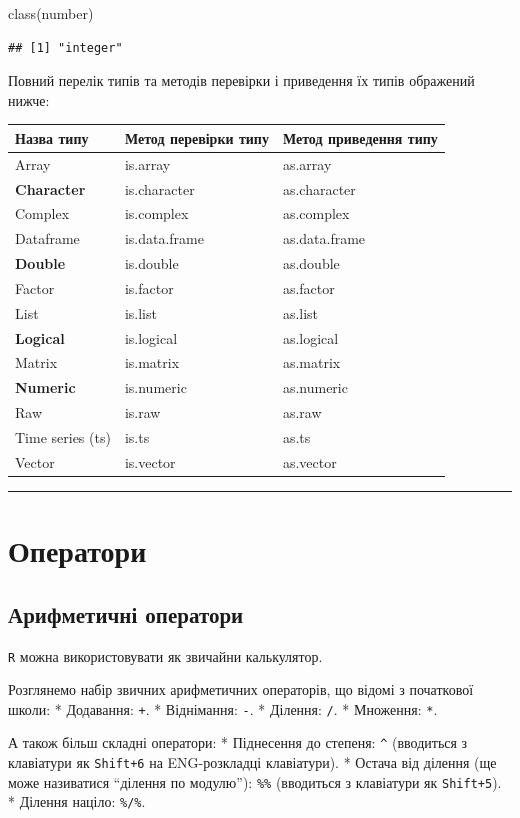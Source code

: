 \documentclass[
]{book}
\newenvironment{Shaded}{\begin{snugshade}}{\end{snugshade}}
\newcommand{\FunctionTok}[1]{\textcolor[rgb]{0.00,0.00,0.00}{#1}}
\newcommand{\NormalTok}[1]{#1}
\begin{document}
\begin{Shaded}
\begin{Highlighting}[]
\FunctionTok{class}\NormalTok{(number)}
\end{Highlighting}
\end{Shaded}

\begin{verbatim}
## [1] "integer"
\end{verbatim}

Повний перелік типів та методів перевірки і приведення їх типів ображений нижче:

\begin{longtable}[]{@{}lll@{}}
\toprule
Назва типу & Метод перевірки типу & Метод приведення типу\tabularnewline
\midrule
\endhead
Array & is.array & as.array\tabularnewline
\textbf{Character} & is.character & as.character\tabularnewline
Complex & is.complex & as.complex\tabularnewline
Dataframe & is.data.frame & as.data.frame\tabularnewline
\textbf{Double} & is.double & as.double\tabularnewline
Factor & is.factor & as.factor\tabularnewline
List & is.list & as.list\tabularnewline
\textbf{Logical} & is.logical & as.logical\tabularnewline
Matrix & is.matrix & as.matrix\tabularnewline
\textbf{Numeric} & is.numeric & as.numeric\tabularnewline
Raw & is.raw & as.raw\tabularnewline
Time series (ts) & is.ts & as.ts\tabularnewline
Vector & is.vector & as.vector\tabularnewline
\bottomrule
\end{longtable}

\begin{center}\rule{0.5\linewidth}{0.5pt}\end{center}

\hypertarget{chapter23}{%
\section{Оператори}\label{chapter23}}

\hypertarget{chapter231}{%
\subsection{Арифметичні оператори}\label{chapter231}}

\texttt{R} можна використовувати як звичайни калькулятор.

Розглянемо набір звичних арифметичних операторів, що відомі з початкової школи:
* Додавання: \texttt{+}.
* Віднімання: \texttt{-}.
* Ділення: \texttt{/}.
* Множення: \texttt{*}.

А також більш складні оператори:
* Піднесення до степеня: \texttt{\^{}} (вводиться з клавіатури як \texttt{Shift+6} на ENG-розкладці клавіатури).
* Остача від ділення (ще може називатися ``ділення по модулю''): \texttt{\%\%} (вводиться з клавіатури як \texttt{Shift+5}).
* Ділення націло: \texttt{\%/\%}.
\end{document}
